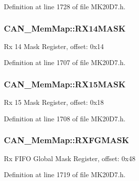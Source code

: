 Definition at line 1728 of file M\+K20\+D7.\+h.

\subsubsection[{\texorpdfstring{R\+X14\+M\+A\+SK}{RX14MASK}}]{ C\+A\+N\+\_\+\+Mem\+Map\+::\+R\+X14\+M\+A\+SK}\hypertarget{struct_c_a_n___mem_map_ad9454220446b5a706a53b100d31c223a}{}\label{struct_c_a_n___mem_map_ad9454220446b5a706a53b100d31c223a}
Rx 14 Mask Register, offset\+: 0x14 

Definition at line 1707 of file M\+K20\+D7.\+h.

\subsubsection[{\texorpdfstring{R\+X15\+M\+A\+SK}{RX15MASK}}]{ C\+A\+N\+\_\+\+Mem\+Map\+::\+R\+X15\+M\+A\+SK}\hypertarget{struct_c_a_n___mem_map_a4e60a1ec55f8fc14e4cdcd00e922d76d}{}\label{struct_c_a_n___mem_map_a4e60a1ec55f8fc14e4cdcd00e922d76d}
Rx 15 Mask Register, offset\+: 0x18 

Definition at line 1708 of file M\+K20\+D7.\+h.

\subsubsection[{\texorpdfstring{R\+X\+F\+G\+M\+A\+SK}{RXFGMASK}}]{ C\+A\+N\+\_\+\+Mem\+Map\+::\+R\+X\+F\+G\+M\+A\+SK}\hypertarget{struct_c_a_n___mem_map_a6b04904e930a16afe225f4b7d55f7101}{}\label{struct_c_a_n___mem_map_a6b04904e930a16afe225f4b7d55f7101}
Rx F\+I\+FO Global Mask Register, offset\+: 0x48 

Definition at line 1719 of file M\+K20\+D7.\+h.

